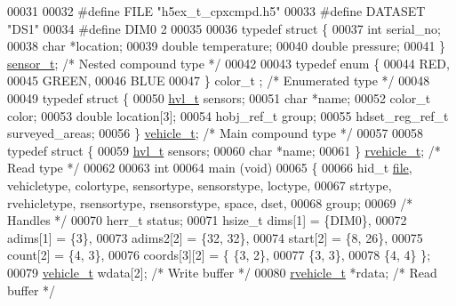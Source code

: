 \begin{DoxyCode}
00031 
00032 \textcolor{preprocessor}{#define FILE            "h5ex\_t\_cpxcmpd.h5"}
00033 \textcolor{preprocessor}{#define DATASET         "DS1"}
00034 \textcolor{preprocessor}{#define DIM0            2}
00035 
00036 \textcolor{keyword}{typedef} \textcolor{keyword}{struct }\{
00037     \textcolor{keywordtype}{int}     serial\_no;
00038     \textcolor{keywordtype}{char}    *location;
00039     \textcolor{keywordtype}{double}  temperature;
00040     \textcolor{keywordtype}{double}  pressure;
00041 \} \hyperlink{structsensor__t}{sensor\_t};                                 \textcolor{comment}{/* Nested compound type */}
00042 
00043 \textcolor{keyword}{typedef} \textcolor{keyword}{enum} \{
00044     RED,
00045     GREEN,
00046     BLUE
00047 \} color\_t  ;                                \textcolor{comment}{/* Enumerated type */}
00048 
00049 \textcolor{keyword}{typedef} \textcolor{keyword}{struct }\{
00050     \hyperlink{structhvl__t}{hvl\_t}               sensors;
00051     \textcolor{keywordtype}{char}                *name;
00052     color\_t             color;
00053     \textcolor{keywordtype}{double}              location[3];
00054     hobj\_ref\_t          group;
00055     hdset\_reg\_ref\_t     surveyed\_areas;
00056 \} \hyperlink{structvehicle__t}{vehicle\_t};                                \textcolor{comment}{/* Main compound type */}
00057 
00058 \textcolor{keyword}{typedef} \textcolor{keyword}{struct }\{
00059     \hyperlink{structhvl__t}{hvl\_t}       sensors;
00060     \textcolor{keywordtype}{char}        *name;
00061 \} \hyperlink{structrvehicle__t}{rvehicle\_t};                               \textcolor{comment}{/* Read type */}
00062 
00063 \textcolor{keywordtype}{int}
00064 main (\textcolor{keywordtype}{void})
00065 \{
00066     hid\_t       \hyperlink{structfile}{file}, vehicletype, colortype, sensortype, sensorstype, loctype,
00067                 strtype, rvehicletype, rsensortype, rsensorstype, space, dset,
00068                 group;
00069                                             \textcolor{comment}{/* Handles */}
00070     herr\_t      status;
00071     hsize\_t     dims[1] = \{DIM0\},
00072                 adims[1] = \{3\},
00073                 adims2[2] = \{32, 32\},
00074                 start[2] = \{8, 26\},
00075                 count[2] = \{4, 3\},
00076                 coords[3][2] = \{ \{3, 2\},
00077                                  \{3, 3\},
00078                                  \{4, 4\} \};
00079     \hyperlink{structvehicle__t}{vehicle\_t}   wdata[2];                   \textcolor{comment}{/* Write buffer */}
00080     \hyperlink{structrvehicle__t}{rvehicle\_t}  *rdata;                     \textcolor{comment}{/* Read buffer */}

\end{DoxyCode}
